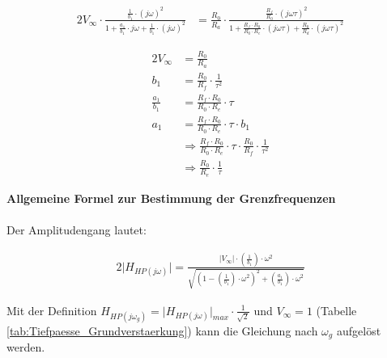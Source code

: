 \begin{alignat}{2}
V_{\infty} \cdot \frac{ \frac{1}{b_{1}} \cdot (j \omega)^2}{1 + \frac{a_{1}}{b_{1}} \cdot j \omega + \frac{1}{b_{1}} \cdot \left ( j \omega \right)^2} &= \frac{R_{0}}{R_{a}} \cdot \frac{ \frac{R_{f} }{R_{0}} \cdot \left( j \omega \tau \right)^2  }{1+\frac{R_{f} \cdot R_{0}}{R_{0} \cdot R_{e}} \cdot  \left(j \omega \tau \right) + \frac{R_{0}}{R_{d}} \cdot \left ( j \omega \tau \right)^2}
\end{alignat}

\begin{alignat}{2}
V_{\infty} &= \frac{R_{0}}{R_{a}}\\
b_{1} &= \frac{R_{0}}{R_{f}} \cdot \frac{1}{\tau^2}\\
\frac{a_{1}}{b_{1}} &= \frac{R_{f} \cdot R_{0}}{R_{0} \cdot R_{e}} \cdot \tau\\
a_{1} &= \frac{R_{f} \cdot R_{0}}{R_{0} \cdot R_{e} } \cdot \tau \cdot b_{1}\\
&\Rightarrow \frac{R_{f} \cdot R_{0}}{R_{0} \cdot R_{e} } \cdot \tau \cdot \frac{R_{0}}{R_{f}} \cdot \frac{1}{\tau^2}\\
&\Rightarrow \frac{R_{0}}{R_{e}} \cdot \frac{1}{\tau}
\end{alignat}

\newpage

\noindent \textbf{Allgemeine Formel zur Bestimmung der Grenzfrequenzen}\\\\

\noindent Der Amplitudengang lautet:

\begin{alignat}{2}
\lvert H_{HP (j \omega)} \rvert = \frac{\lvert V_{\infty} \rvert \cdot \left(\frac{1}{b_{1}} \right) \cdot \omega^2}{\sqrt{\left(1 - \left(\frac{1}{b_{1}} \right) \cdot \omega^2 \right)^2 + \left(\frac{a_{1}}{b_{1}} \right) \cdot \omega^2}}
\end{alignat}

\noindent Mit der Definition $H_{HP (j \omega_{g})} = \lvert H_{HP (j \omega)} \rvert_{max} \cdot \frac{1}{\sqrt{2}}$ und $V_{\infty} = 1$ (Tabelle \ref{tab:Tiefpaesse_Grundverstaerkung}) kann die Gleichung nach $\omega_{g}$ aufgelöst werden.

